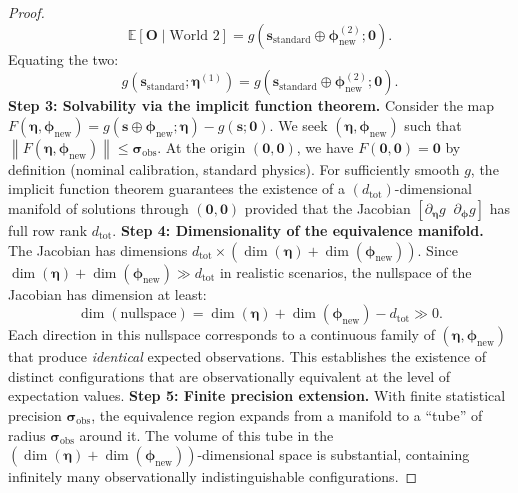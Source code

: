 \documentclass[11pt,a4paper]{article}
\theoremstyle{definition}
\newcommand{\E}{\mathbb{E}}
\newcommand{\norm}[1]{\left\lVert#1\right\rVert}
\begin{document}
\begin{proof}
\begin{equation}
\E[\mathbf{O} \mid \text{World 2}] = g(\mathbf{s}_{\mathrm{standard}} \oplus \boldsymbol{\phi}_{\mathrm{new}}^{(2)}; \mathbf{0}).
\end{equation}
Equating the two:
\begin{equation}\label{eq:equating}
g(\mathbf{s}_{\mathrm{standard}}; \boldsymbol{\eta}^{(1)}) = g(\mathbf{s}_{\mathrm{standard}} \oplus \boldsymbol{\phi}_{\mathrm{new}}^{(2)}; \mathbf{0}).
\end{equation}
\textbf{Step 3: Solvability via the implicit function theorem.}
Consider the map $F(\boldsymbol{\eta}, \boldsymbol{\phi}_{\mathrm{new}}) = g(\mathbf{s} \oplus \boldsymbol{\phi}_{\mathrm{new}}; \boldsymbol{\eta}) - g(\mathbf{s}; \mathbf{0})$. We seek $(\boldsymbol{\eta}, \boldsymbol{\phi}_{\mathrm{new}})$ such that $\norm{F(\boldsymbol{\eta}, \boldsymbol{\phi}_{\mathrm{new}})} \leq \boldsymbol{\sigma}_{\mathrm{obs}}$.
At the origin $(\mathbf{0}, \mathbf{0})$, we have $F(\mathbf{0}, \mathbf{0}) = \mathbf{0}$ by definition (nominal calibration, standard physics). For sufficiently smooth $g$, the implicit function theorem guarantees the existence of a $(d_{\mathrm{tot}})$-dimensional manifold of solutions through $(\mathbf{0}, \mathbf{0})$ provided that the Jacobian $[\partial_{\boldsymbol{\eta}} g \;\; \partial_{\boldsymbol{\phi}} g]$ has full row rank $d_{\mathrm{tot}}$.
\textbf{Step 4: Dimensionality of the equivalence manifold.}
The Jacobian has dimensions $d_{\mathrm{tot}} \times (\dim(\boldsymbol{\eta}) + \dim(\boldsymbol{\phi}_{\mathrm{new}}))$. Since $\dim(\boldsymbol{\eta}) + \dim(\boldsymbol{\phi}_{\mathrm{new}}) \gg d_{\mathrm{tot}}$ in realistic scenarios, the nullspace of the Jacobian has dimension at least:
\begin{equation}
\dim(\text{nullspace}) = \dim(\boldsymbol{\eta}) + \dim(\boldsymbol{\phi}_{\mathrm{new}}) - d_{\mathrm{tot}} \gg 0.
\end{equation}
Each direction in this nullspace corresponds to a continuous family of $(\boldsymbol{\eta}, \boldsymbol{\phi}_{\mathrm{new}})$ that produce \emph{identical} expected observations. This establishes the existence of distinct configurations that are observationally equivalent at the level of expectation values.
\textbf{Step 5: Finite precision extension.}
With finite statistical precision $\boldsymbol{\sigma}_{\mathrm{obs}}$, the equivalence region expands from a manifold to a ``tube'' of radius $\boldsymbol{\sigma}_{\mathrm{obs}}$ around it. The volume of this tube in the $(\dim(\boldsymbol{\eta}) + \dim(\boldsymbol{\phi}_{\mathrm{new}}))$-dimensional space is substantial, containing infinitely many observationally indistinguishable configurations.

\end{proof}
\end{document}
